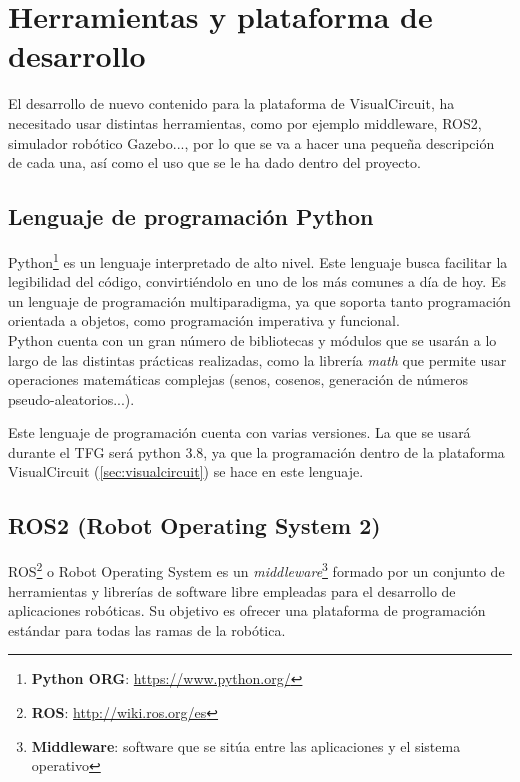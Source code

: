 \chapter{Herramientas y plataforma de desarrollo}
\label{cap:capitulo3}

El desarrollo de nuevo contenido para la plataforma de VisualCircuit, ha necesitado usar distintas herramientas, como por ejemplo middleware,
ROS2, simulador robótico Gazebo..., por lo que se va a hacer una pequeña descripción de cada una, así como el uso que se le ha dado dentro del proyecto.

\section{Lenguaje de programación Python}
\label{sec:lenguaje_programación_python}

Python\footnote{\textbf{Python ORG}: \url{https://www.python.org/}} es un lenguaje interpretado de alto nivel. Este lenguaje busca facilitar la legibilidad del código, convirtiéndolo en uno de los más comunes a día de hoy.
Es un lenguaje de programación multiparadigma, ya que soporta tanto programación orientada a objetos, como programación imperativa y funcional.\\

Python cuenta con un gran número de bibliotecas y módulos que se usarán a lo largo de las distintas prácticas realizadas, como la librería \textit{math} que
permite usar operaciones matemáticas complejas (senos, cosenos, generación de números pseudo-aleatorios...).

Este lenguaje de programación cuenta con varias versiones. La que se usará durante el TFG será python 3.8, ya que la programación dentro
de la plataforma VisualCircuit (\ref{sec:visualcircuit}) se hace en este lenguaje.

\section{ROS2 (Robot Operating System 2)}
\label{sec:ros2}

ROS\footnote{\textbf{ROS}: \url{http://wiki.ros.org/es}} o Robot Operating System es un
\textit{middleware}\footnote{{\textbf{Middleware}: software que se sitúa entre las aplicaciones y el sistema operativo}} formado
por un conjunto de herramientas y librerías de software libre empleadas para el desarrollo de aplicaciones robóticas.
Su objetivo es ofrecer una plataforma de programación estándar para todas las ramas de la robótica.\\

